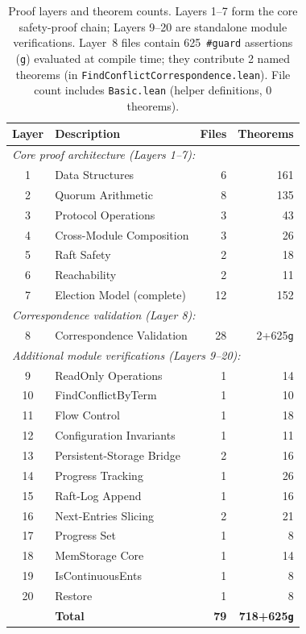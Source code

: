\documentclass[sigconf,10pt]{acmart}
\begin{document}
\begin{table}[h]
\centering\small
\begin{tabular}{clrr}
\toprule
Layer & Description & Files & Theorems \\
\midrule
\multicolumn{4}{l}{\emph{Core proof architecture (Layers 1--7):}} \\
1 & Data Structures     & 6  & 161 \\
2 & Quorum Arithmetic   & 8  & 135 \\
3 & Protocol Operations & 3  &  43 \\
4 & Cross-Module Composition & 3 & 26 \\
5 & Raft Safety         & 2  & 18  \\
6 & Reachability        & 2  & 11  \\
7 & Election Model (complete) & 12 & 152 \\
\midrule
\multicolumn{4}{l}{\emph{Correspondence validation (Layer 8):}} \\
8 & Correspondence Validation & 28 & 2+625\texttt{g} \\
\midrule
\multicolumn{4}{l}{\emph{Additional module verifications (Layers 9--20):}} \\
9  & ReadOnly Operations      & 1  & 14  \\
10 & FindConflictByTerm       & 1  & 10  \\
11 & Flow Control             & 1  & 18  \\
12 & Configuration Invariants & 1  & 11 \\
13 & Persistent-Storage Bridge & 2 & 16 \\
14 & Progress Tracking        & 1  & 26 \\
15 & Raft-Log Append          & 1  & 16 \\
16 & Next-Entries Slicing     & 2  & 21 \\
17 & Progress Set             & 1  &  8 \\
18 & MemStorage Core          & 1  & 14 \\
19 & IsContinuousEnts         & 1  &  8 \\
20 & Restore                  & 1  &  8 \\
\midrule
  & \textbf{Total}      & \textbf{79} & \textbf{718+625\texttt{g}} \\
\bottomrule
\end{tabular}
\caption{Proof layers and theorem counts.  Layers 1--7 form the
core safety-proof chain; Layers 9--20 are standalone module
verifications.  Layer~8 files contain 625~\texttt{\#guard} assertions
(\texttt{g}) evaluated at compile time; they contribute 2 named
theorems (in \texttt{FindConflictCorrespondence.lean}).
File count includes \texttt{Basic.lean} (helper definitions, 0
theorems).}
\label{tab:layers}
\end{table}
\end{document}
